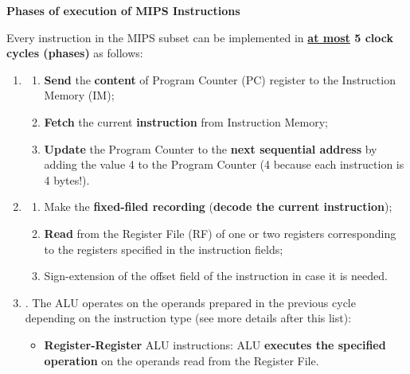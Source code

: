 \begin{center}
    \large
    \textcolor{Red3}{\textbf{Phases of execution of MIPS Instructions}}
    \label{Phases of execution of MIPS Instructions}
\end{center}
Every instruction in the MIPS subset can be implemented in \textbf{\underline{at most} 5 clock cycles (phases)} as follows:
\begin{enumerate}
    \item {}
    \begin{enumerate}
        \item \textbf{Send} the \textbf{content} of Program Counter (PC) register to the Instruction Memory (IM);

        \item \textbf{Fetch} the current \textbf{instruction} from Instruction Memory;
        
        \item \textbf{Update} the Program Counter to the \textbf{next sequential address} by adding the value 4 to the Program Counter (4 because each instruction is 4 bytes!).
    \end{enumerate}
    
    \item {}
    \begin{enumerate}
        \item Make the \textbf{fixed-filed recording} (\textbf{decode the current instruction});
        
        \item \textbf{Read} from the Register File (RF) of one or two registers corresponding to the registers specified in the instruction fields;
        
        \item Sign-extension of the offset field of the instruction in case it is needed.
    \end{enumerate}

    \item {}. The ALU operates on the operands prepared in the previous cycle depending on the instruction type (see more details after this list):
    \begin{itemize}
        \item \textbf{Register-Register} ALU instructions: ALU \textbf{executes the specified operation} on the operands read from the Register File.


\end{itemize}
\end{enumerate}

